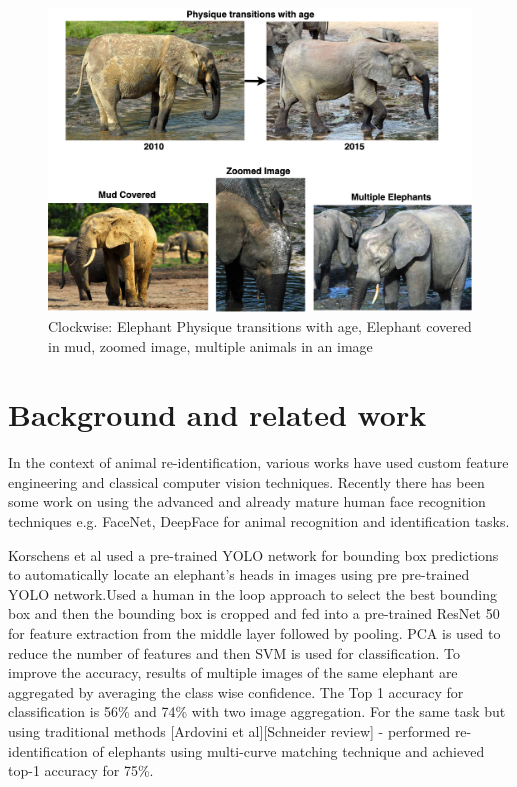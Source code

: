 \documentclass[10pt,twocolumn,letterpaper]{article}
\begin{document}
\begin{figure}[t]
  \centering
  \includegraphics[scale=0.2]{challenges}
   \caption{Clockwise: Elephant Physique transitions with age, Elephant covered in mud, zoomed image, multiple animals in an image}
   \label{fig:challenges}
\end{figure}



\section{Background and related work}
\label{sec:backgoround}

In the context of animal re-identification, various works have used custom feature engineering and classical computer vision techniques. Recently there has been some work on using the advanced and already mature human face recognition techniques e.g. FaceNet, DeepFace for animal recognition and identification tasks.

Korschens et al \cite{Korschens} used a pre-trained YOLO network for bounding box predictions to automatically locate an elephant's heads in images using pre pre-trained YOLO network.Used a human in the loop approach to select the best bounding box and then the bounding box is cropped and fed into a pre-trained ResNet 50 for feature extraction from the middle layer followed by pooling. PCA is used to reduce the number of features and then SVM is used for classification. To improve the accuracy, results of multiple images of the same elephant are aggregated by averaging the class wise confidence. The Top 1 accuracy for classification is 56\% and 74\% with two image aggregation. For the same task but using traditional methods [Ardovini et al][Schneider review] - performed re-identification of elephants using multi-curve matching technique and achieved top-1 accuracy for 75\%.
\end{document}
